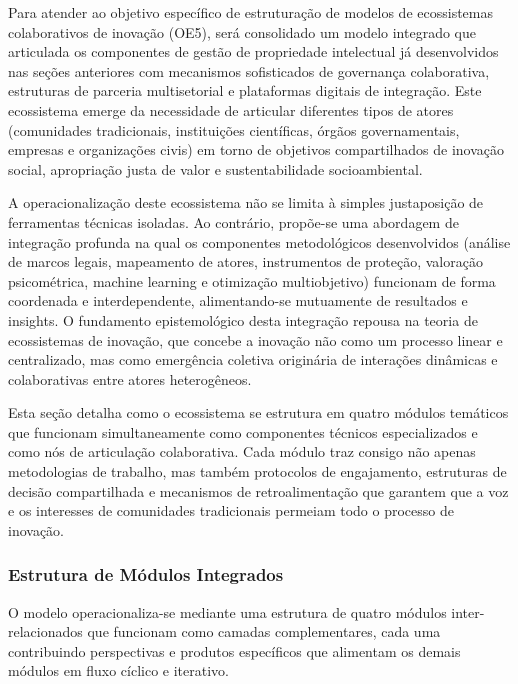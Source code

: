 Para atender ao objetivo específico de estruturação de modelos de ecossistemas colaborativos de inovação (OE5), será consolidado um modelo integrado que articulada os componentes de gestão de propriedade intelectual já desenvolvidos nas seções anteriores com mecanismos sofisticados de governança colaborativa, estruturas de parceria multisetorial e plataformas digitais de integração. Este ecossistema emerge da necessidade de articular diferentes tipos de atores (comunidades tradicionais, instituições científicas, órgãos governamentais, empresas e organizações civis) em torno de objetivos compartilhados de inovação social, apropriação justa de valor e sustentabilidade socioambiental.

A operacionalização deste ecossistema não se limita à simples justaposição de ferramentas técnicas isoladas. Ao contrário, propõe-se uma abordagem de integração profunda na qual os componentes metodológicos desenvolvidos (análise de marcos legais, mapeamento de atores, instrumentos de proteção, valoração psicométrica, machine learning e otimização multiobjetivo) funcionam de forma coordenada e interdependente, alimentando-se mutuamente de resultados e insights. O fundamento epistemológico desta integração repousa na teoria de ecossistemas de inovação, que concebe a inovação não como um processo linear e centralizado, mas como emergência coletiva originária de interações dinâmicas e colaborativas entre atores heterogêneos.

Esta seção detalha como o ecossistema se estrutura em quatro módulos temáticos que funcionam simultaneamente como componentes técnicos especializados e como nós de articulação colaborativa. Cada módulo traz consigo não apenas metodologias de trabalho, mas também protocolos de engajamento, estruturas de decisão compartilhada e mecanismos de retroalimentação que garantem que a voz e os interesses de comunidades tradicionais permeiam todo o processo de inovação.

\subsubsection{Estrutura de Módulos Integrados}

O modelo operacionaliza-se mediante uma estrutura de quatro módulos inter-relacionados que funcionam como camadas complementares, cada uma contribuindo perspectivas e produtos específicos que alimentam os demais módulos em fluxo cíclico e iterativo.

